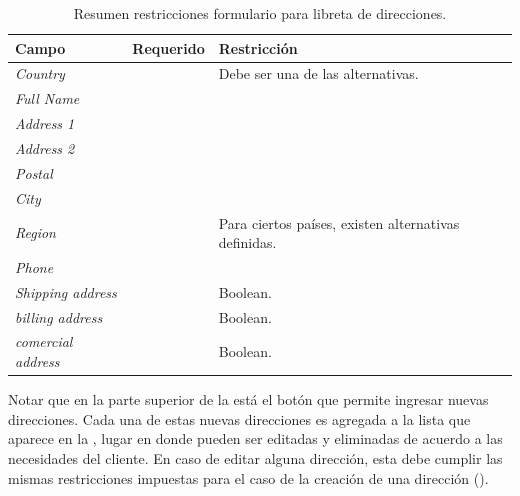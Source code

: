 		\begin{table}[h!]
		    \centering
			\begin{tabular}{ |l|c||l| }
				\hline Campo & Requerido & Restricción \\ \hline
				\multirow{1}{*}{\textit{Country}} 			&  \checkmark 	&  Debe ser una de las alternativas.\\ \hline
				\multirow{1}{*}{\textit{Full Name}} 		&  \checkmark	& \\ \hline
				\multirow{1}{*}{\textit{Address 1}} 		&  \checkmark	& \\ \hline
				\multirow{1}{*}{\textit{Address 2}} 		&  				& \\ \hline
				\multirow{1}{*}{\textit{Postal}} 			&  \checkmark	& \\ \hline
				\multirow{1}{*}{\textit{City}} 				&  \checkmark	& \\ \hline
				\multirow{1}{*}{\textit{Region}} 			&  \checkmark	& Para ciertos países, existen alternativas definidas.\\ \hline
				\multirow{1}{*}{\textit{Phone}} 			&  \checkmark	& \\ \hline
				\multirow{1}{*}{\textit{Shipping address}} 	&  \checkmark	& Boolean. \\ \hline
				\multirow{1}{*}{\textit{billing address}} 	&  \checkmark	& Boolean. \\ \hline
				\multirow{1}{*}{\textit{comercial address}} &  \checkmark	& Boolean. \\ \hline
			\end{tabular}
		 	\caption{Resumen restricciones formulario para libreta de direcciones.}
		    \label{tab:profile:form:restrictions:address}
		\end{table}

		Notar que en la parte superior de la  está el botón que permite ingresar nuevas direcciones. Cada una de estas nuevas direcciones es agregada a la lista que aparece en la , lugar en donde pueden ser editadas y eliminadas de acuerdo a las necesidades del cliente. En caso de editar alguna dirección, esta debe cumplir las mismas restricciones impuestas para el caso de la creación de una dirección ().

